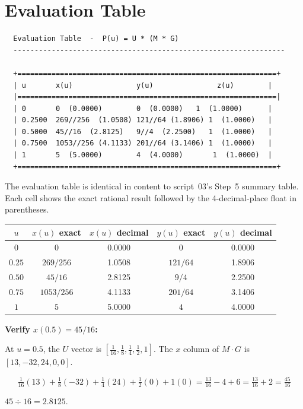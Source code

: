 \documentclass[12pt, a4paper]{article}
\begin{document}
\section{Evaluation Table}

\begin{verbatim}
  Evaluation Table  -  P(u) = U * (M * G)
  ----------------------------------------------------------------

  +=============================================================+
  | u       x(u)               y(u)               z(u)        |
  |=============================================================|
  | 0       0  (0.0000)        0  (0.0000)   1  (1.0000)      |
  | 0.2500  269//256  (1.0508) 121//64 (1.8906) 1  (1.0000)   |
  | 0.5000  45//16  (2.8125)   9//4  (2.2500)   1  (1.0000)   |
  | 0.7500  1053//256 (4.1133) 201//64 (3.1406) 1  (1.0000)   |
  | 1       5  (5.0000)        4  (4.0000)       1  (1.0000)  |
  +=============================================================+
\end{verbatim}

The evaluation table is identical in content to script~03's
Step~5 summary table.
Each cell shows the exact rational result followed by
the 4-decimal-place float in parentheses.

\begin{center}
\begin{tabular}{ccccc}
\toprule
$u$ & $x(u)$ exact & $x(u)$ decimal & $y(u)$ exact & $y(u)$ decimal \\
\midrule
$0$    & $0$              & 0.0000 & $0$       & 0.0000 \\
$0.25$ & $269/256$        & 1.0508 & $121/64$  & 1.8906 \\
$0.50$ & $45/16$          & 2.8125 & $9/4$     & 2.2500 \\
$0.75$ & $1053/256$       & 4.1133 & $201/64$  & 3.1406 \\
$1$    & $5$              & 5.0000 & $4$       & 4.0000 \\
\bottomrule
\end{tabular}
\end{center}

\begin{examplebox}
\textbf{Verify $x(0.5) = 45/16$:}

At $u = 0.5$, the $U$ vector is
$[\tfrac{1}{16}, \tfrac{1}{8}, \tfrac{1}{4}, \tfrac{1}{2}, 1]$.
The $x$ column of $M \cdot G$ is $[13, -32, 24, 0, 0]$.

\[
  \tfrac{1}{16}(13) + \tfrac{1}{8}(-32) + \tfrac{1}{4}(24)
  + \tfrac{1}{2}(0) + 1(0)
  = \tfrac{13}{16} - 4 + 6
  = \tfrac{13}{16} + 2
  = \tfrac{45}{16}
\]

$45 \div 16 = 2.8125$. \checkmark
\end{examplebox}
\end{document}
